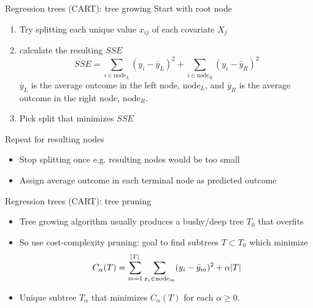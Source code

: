 \documentclass{beamer}
\begin{document}
\begin{frame}{Regression trees (CART): tree growing}
  Start with root node
  
  \begin{enumerate}[<+(1)->]
  \item Try splitting each unique value $x_{ij}$ of each covariate $X_{j}$
  \item calculate the resulting $SSE$
  \begin{equation*}
    SSE = \sum_{i \in \text{node}_{L}} (y_{i} - \bar{y}_{L})^2 + \sum_{i \in \text{node}_{R}} (y_{i} - \bar{y}_{R})^2
  \end{equation*}
  $\bar{y}_{L}$ is the average outcome in the left node, $\text{node}_{L}$, and $\bar{y}_{R}$ is the average outcome in the right node, $\text{node}_{R}$.
  \item Pick split that minimizes $SSE$
    \end{enumerate}
  \pause
  Repeat for resulting nodes 
    
  \begin{itemize}[<+(1)->]
  \item Stop splitting once e.g. resulting nodes would be too small
  \item Assign average outcome in each terminal node as predicted outcome 
  \end{itemize}
\end{frame}

\begin{frame}[c]{Regression trees (CART): tree pruning}
  \begin{itemize}[<+->]
    \item Tree growing algorithm usually produces a bushy/deep tree $T_{0}$ that overfits
    \item So use cost-complexity pruning: goal to find subtrees $T \subset T_{0}$ which minimize
    \begin{equation*}
        C_{\alpha}(T) = \sum_{m = 1}^{\abs{T}} \sum_{x_{i} \in \text{node}_{m}} (y_{i} - \bar{y}_{m})^2 + \alpha \abs{T}
    \end{equation*}
    \item Unique subtree $T_{\alpha}$ that minimizes $C_{\alpha}(T)$ for each $\alpha \geq 0$.
  \end{itemize}
\end{frame}
\end{document}
